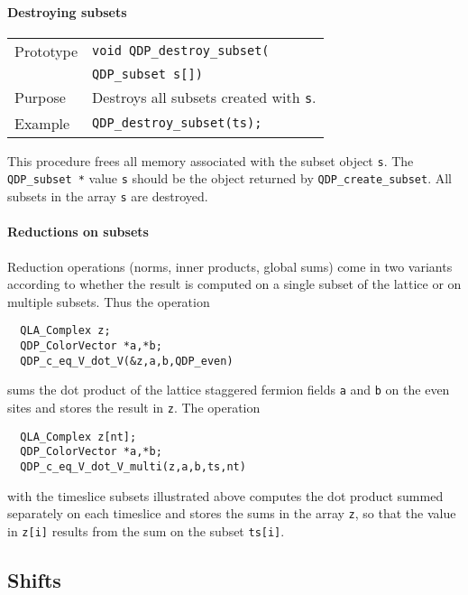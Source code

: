 \documentclass{article}
\begin{document}
\paragraph{Destroying subsets}

\begin{flushleft}
  \begin{tabular}{|l|l|}
  \hline
  Prototype      & \verb|void QDP_destroy_subset(|\\
                 & \verb|QDP_subset s[])| \\ 
\hline
Purpose        & Destroys all subsets created with \verb|s|. \\
    \hline
Example  & \verb|QDP_destroy_subset(ts);| \\
\hline
  \end{tabular}
\end{flushleft}
%
This procedure frees all memory associated with the subset object
\verb|s|.  The \verb|QDP_subset *| value \verb|s| should be the object
returned by \verb|QDP_create_subset|.  All subsets in the array
\verb|s| are destroyed.

\paragraph{Reductions on subsets}

Reduction operations (norms, inner products, global sums) come in two
variants according to whether the result is computed on a single
subset of the lattice or on multiple subsets.  Thus the operation
%
\begin{verbatim}
  QLA_Complex z;
  QDP_ColorVector *a,*b;
  QDP_c_eq_V_dot_V(&z,a,b,QDP_even)
\end{verbatim}
%
sums the dot product of the lattice staggered fermion fields \verb|a|
and \verb|b| on the even sites and stores the result in \verb|z|.  The
operation
%
\begin{verbatim}
  QLA_Complex z[nt];
  QDP_ColorVector *a,*b;
  QDP_c_eq_V_dot_V_multi(z,a,b,ts,nt)
\end{verbatim}
%
with the timeslice subsets illustrated above computes the dot product
summed separately on each timeslice and stores the sums in the array
\verb|z|, so that the value in \verb|z[i]| results from the sum on the
subset \verb|ts[i]|.

\subsection{Shifts}
\end{document}
